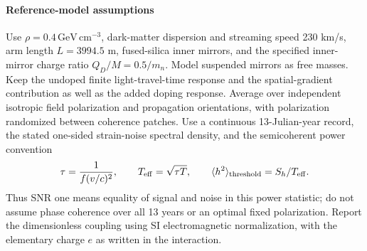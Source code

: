 \paragraph*{Reference-model assumptions}
Use $\rho=0.4\,\mathrm{GeV\,cm^{-3}}$, dark-matter dispersion and streaming
speed 230 km/s, arm length $L=3994.5$ m, fused-silica inner mirrors, and the
specified inner-mirror charge ratio $Q_D/M=0.5/m_n$. Model suspended mirrors
as free masses. Keep the undoped finite light-travel-time response and the
spatial-gradient contribution as well as the added doping response.
Average over independent isotropic field polarization and propagation
orientations, with polarization randomized between coherence patches.
Use a continuous 13-Julian-year record, the stated one-sided strain-noise
spectral density, and the semicoherent power convention
\[
\tau=\frac{1}{f(v/c)^2},\qquad
T_{\rm eff}=\sqrt{\tau T},\qquad
\langle h^2\rangle_{\rm threshold}=S_h/T_{\rm eff}.
\]
Thus SNR one means equality of signal and noise in this power statistic;
do not assume phase coherence over all 13 years or an optimal fixed
polarization. Report the dimensionless coupling using SI electromagnetic
normalization, with the elementary charge $e$ as written in the interaction.
